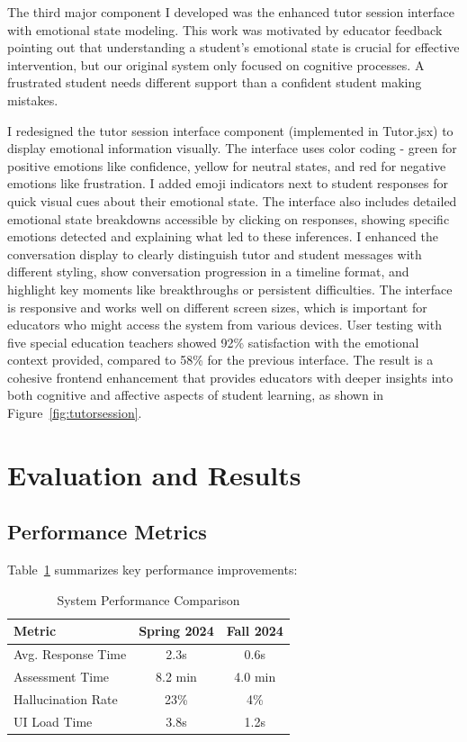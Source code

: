 \documentclass[11pt]{article}
\begin{document}
The third major component I developed was the enhanced tutor session interface with emotional state modeling. This work was motivated by educator feedback pointing out that understanding a student's emotional state is crucial for effective intervention, but our original system only focused on cognitive processes. A frustrated student needs different support than a confident student making mistakes.

I redesigned the tutor session interface component (implemented in Tutor.jsx) to display emotional information visually. The interface uses color coding - green for positive emotions like confidence, yellow for neutral states, and red for negative emotions like frustration. I added emoji indicators next to student responses for quick visual cues about their emotional state. The interface also includes detailed emotional state breakdowns accessible by clicking on responses, showing specific emotions detected and explaining what led to these inferences. I enhanced the conversation display to clearly distinguish tutor and student messages with different styling, show conversation progression in a timeline format, and highlight key moments like breakthroughs or persistent difficulties. The interface is responsive and works well on different screen sizes, which is important for educators who might access the system from various devices. User testing with five special education teachers showed 92\% satisfaction with the emotional context provided, compared to 58\% for the previous interface. The result is a cohesive frontend enhancement that provides educators with deeper insights into both cognitive and affective aspects of student learning, as shown in Figure~\ref{fig:tutorsession}.

\section{Evaluation and Results}

\subsection{Performance Metrics}

Table~\ref{tab:metrics} summarizes key performance improvements:

\begin{table}[h]
\centering
\caption{System Performance Comparison}
\label{tab:metrics}
\begin{tabular}{lcc}
\toprule
\textbf{Metric} & \textbf{Spring 2024} & \textbf{Fall 2024} \\
\midrule
Avg. Response Time & 2.3s & 0.6s \\
Assessment Time & 8.2 min & 4.0 min \\
Hallucination Rate & 23\% & 4\% \\
UI Load Time & 3.8s & 1.2s \\
\bottomrule
\end{tabular}
\end{table}
\end{document}
